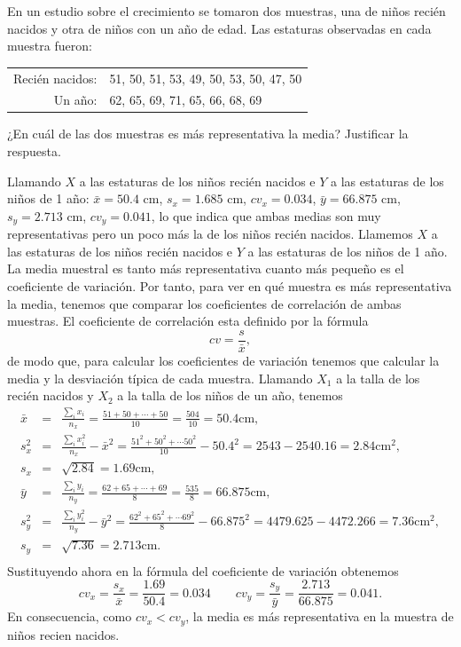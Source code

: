 {En un estudio sobre el crecimiento se tomaron dos muestras, una de niños recién nacidos y otra de niños con un año de edad. Las estaturas observadas en cada muestra fueron:
\begin{center}
\begin{tabular}{rl}
Recién nacidos: & 51, 50, 51, 53, 49, 50, 53, 50, 47, 50\\
Un año: & 62, 65, 69, 71, 65, 66, 68, 69
\end{tabular}
\end{center}

¿En cuál de las dos muestras es más representativa la media? Justificar la respuesta.
}
{Llamando $X$ a las estaturas de los niños recién nacidos e $Y$ a las estaturas de los niños de 1 año: 
$\bar x = 50.4$ cm, $s_x = 1.685$ cm, $cv_x=0.034$, $\bar y=66.875$ cm, $s_y=2.713$ cm, $cv_y=0.041$, lo que indica que ambas medias son muy representativas pero un poco más la de los niños recién nacidos.  
}
{Llamemos $X$ a las estaturas de los niños recién nacidos e $Y$ a las estaturas de los niños de 1 año. 
La media muestral es tanto más representativa cuanto más pequeño es el coeficiente de variación.
Por tanto, para ver en qué muestra es más representativa la media, tenemos que comparar los coeficientes de correlación de ambas muestras.
El coeficiente de correlación esta definido por la fórmula
\[
cv=\frac{s}{\bar{x}},
\]
de modo que, para calcular los coeficientes de variación tenemos que calcular la media y la desviación típica de cada muestra. 
Llamando $X_{1}$ a la talla de los recién nacidos y $X_{2}$ a la talla de los niños de un año, tenemos
\begin{eqnarray*}
\bar{x} & = & \frac{\sum_{i}^{}x_{i}}{n_{x}} =
\frac{51+50+\cdots +50}{10} = \frac{504}{10} =50.4 \mbox{cm}, \\
s_{x}^2 & = & \frac{\sum_{i}^{}x_{i}^2}{n_{x}}-\bar{x}^2 =
\frac{51^2+50^2+\cdots 50^2}{10}-50.4^2 = 2543-2540.16 = 2.84 \mbox{cm}^2,  \\
s_{x} & = & \sqrt{2.84} = 1.69 \mbox{cm},  \\
\bar{y} & = & \frac{\sum_{i}^{}y_{i}}{n_{y}} =
\frac{62+65+\cdots +69}{8} = \frac{535}{8} = 66.875 \mbox{cm},  \\
s_{y}^2 & = & \frac{\sum_{i}^{}y_{i}^2}{n_{y}}-\bar{y}^2 =
\frac{62^2+65^2+\cdots 69^2}{8}-66.875^2 = 4479.625-4472.266 = 7.36 \mbox{cm}^2,  \\
s_{y} & = & \sqrt{7.36} = 2.713 \mbox{cm}.  \\
\end{eqnarray*}
Sustituyendo ahora en la fórmula del coeficiente de variación obtenemos
\[ 
cv_{x}=\frac{s_{x}}{\bar{x}} = \frac{1.69}{50.4} = 0.034 \qquad
cv_{y}=\frac{s_{y}}{\bar{y}} = \frac{2.713}{66.875} = 0.041.
\]
En consecuencia, como $cv_{x}<cv_{y}$, la media es más representativa en la muestra de niños recien nacidos.
}


